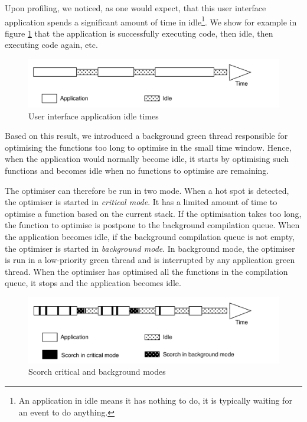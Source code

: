\documentclass[a4paper,12pt,twoside]{../includes/ThesisStyle}
\begin{document}
Upon profiling, we noticed, as one would expect, that this user interface application spends a significant amount of time in idle\footnote{An application in idle means it has nothing to do, it is typically waiting for an event to do anything.}. We show for example in figure \ref{fig:ApplicationIdle} that the application is successfully executing code, then idle, then executing code again, etc. 

\begin{figure}[h!]
    \begin{center}
        \includegraphics[width=0.9\linewidth]{ApplicationIdle}
        \caption{User interface application idle times}
        \label{fig:ApplicationIdle}
    \end{center}
\end{figure}

Based on this result, we introduced a background green thread responsible for optimising the functions too long to optimise in the small time window. Hence, when the application would normally become idle, it starts by optimising such functions and becomes idle when no functions to optimise are remaining.

The optimiser can therefore be run in two mode. When a hot spot is detected, the optimiser is started in \emph{critical mode}. It has a limited amount of time to optimise a function based on the current stack. If the optimisation takes too long, the function to optimise is postpone to the background compilation queue. When the application becomes idle, if the background compilation queue is not empty, the optimiser is started in \emph{background mode}. In background mode, the optimiser is run in a low-priority green thread and is interrupted by any application green thread. When the optimiser has optimised all the functions in the compilation queue, it stops and the application becomes idle.

\begin{figure}[h!]
    \begin{center}
        \includegraphics[width=0.9\linewidth]{ScorchModes}
        \caption{Scorch critical and background modes}
        \label{fig:ScorchModes}
    \end{center}
\end{figure}
\end{document}
